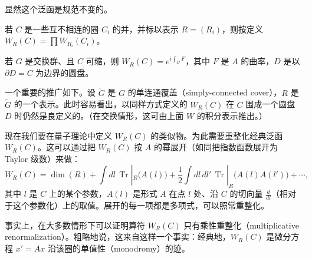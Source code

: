 显然这个泛函是规范不变的。

若 $C$ 是一些互不相连的圈 $C_i$ 的并，并标以表示 $R=(R_i)$，则按定义 $W_R(C)=\prod W_{R_i}(C_i)$。

若 $G$ 是交换群、且 $C$ 可缩，则 $W_R(C)=e^{i\int_D F}$，其中 $F$ 是 $A$ 的曲率，$D$ 是以 $\partial D=C$ 为边界的圆盘。

一个重要的推广如下。设 $\widetilde{G}$ 是 $G$ 的单连通覆盖（simply-connected cover），$R$ 是 $\widetilde{G}$ 的一个表示。此时容易看出，以同样方式定义的 $W_R(C)$ 在 $C$ 围成一个圆盘 $D$ 时仍然是良定义的。（在交换情形，这可由上面 $W$ 的积分表示推出。）

现在我们要在量子理论中定义 $W_R(C)$ 的类似物。为此需要重整化经典泛函 $W_R(C)$。这可以通过把 $W_R(C)$ 按 $A$ 的幂展开（如同把指数函数展开为 Taylor 级数）来做：
\begin{equation}
  \tag{7.9}
  \label{eq:7-9}
  W_R(C)=\dim(R)+\int dl\,\operatorname{Tr}|_R\bigl(A(l)\bigr)+\frac12\int dl\,dl'\,\operatorname{Tr}|_R\bigl(A(l)A(l')\bigr)+\cdots,
\end{equation}
其中 $l$ 是 $C$ 上的某个参数，$A(l)$ 是形式 $A$ 在点 $l$ 处、沿 $C$ 的切向量 $\frac{d}{dl}$（相对于这个参数化）上的取值。展开的每一项都是多项式，可以照常重整化。

事实上，在大多数情形下可以证明算符 $W_R(C)$ 只有乘性重整化（multiplicative renormalization）。粗略地说，这来自这样一个事实：经典地，$W_R(C)$ 是微分方程 $x'=Ax$ 沿该圈的单值性（monodromy）的迹。



